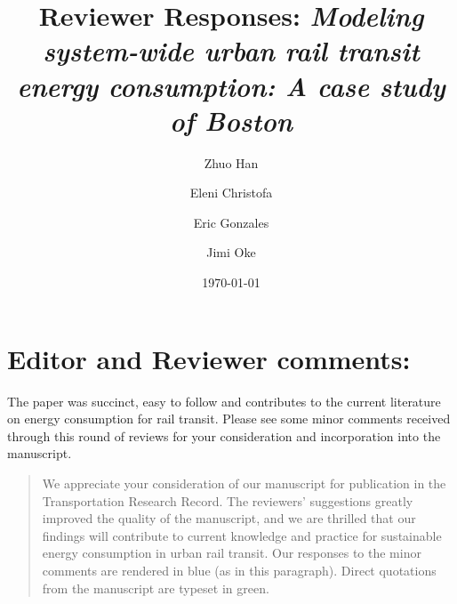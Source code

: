 \documentclass[11pt,twoside]{article}
\numberwithin{equation}{section}
\newcommand{\?}{\stackrel{?}{=}}
\newcommand{\bl}{\color{blue}}
\newcommand{\gr}{\color{green!40!black}}
\begin{document}
\title{Reviewer Responses: {\it Modeling system-wide urban rail transit energy consumption: A case study of Boston}}
\author{Zhuo Han \and Eleni Christofa \and Eric Gonzales \and Jimi Oke}
\date{\today}
\maketitle


\section*{Editor and Reviewer comments:}
The paper was succinct, easy to follow and contributes to the current literature on energy consumption for rail transit.  Please see some minor comments received through this round of reviews for your consideration and incorporation into the manuscript.

\begin{quote}
\bl     We appreciate your consideration of our manuscript for publication in the Transportation Research Record. The reviewers' suggestions greatly improved the quality of the manuscript, and we are thrilled that our findings will contribute to current knowledge and practice for sustainable energy consumption in urban rail transit. Our responses to the minor comments are rendered in {\bl blue} (as in this paragraph). Direct quotations from the manuscript are typeset in {\gr green}.
\end{quote}
\end{document}
